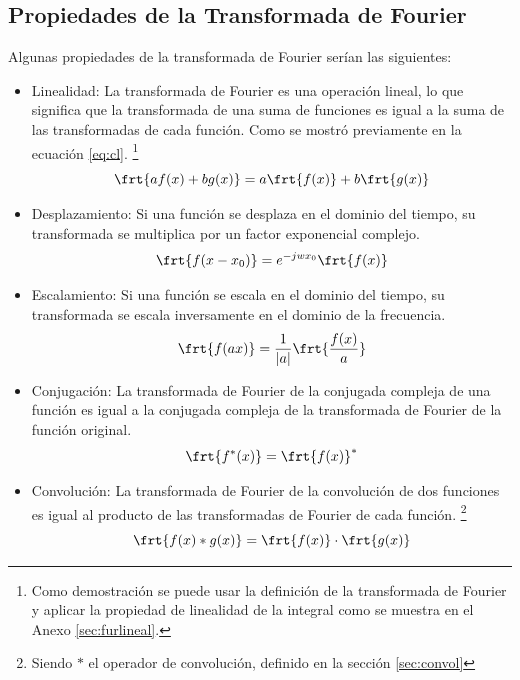 \documentclass[12pt]{article}
\begin{document}
\subsection{Propiedades de la Transformada de Fourier}
Algunas propiedades de la transformada de Fourier serían las siguientes:
\begin{itemize}
    \item Linealidad: La transformada de Fourier es una operación lineal, lo que significa que la transformada de una suma de funciones es igual a la suma de las transformadas de cada función. Como se mostró previamente en la ecuación \ref{eq:cl}. \footnote{Como demostración se puede usar la definición de la transformada de Fourier y aplicar la propiedad de linealidad de la integral como se muestra en el Anexo \ref{sec:furlineal}.}
    $$
    \frt{a f(x) + b g(x)} = a \frt{f(x)} + b \frt{g(x)}
    $$
    \item Desplazamiento: Si una función se desplaza en el dominio del tiempo, su transformada se multiplica por un factor exponencial complejo.
    $$
    \frt{f(x - x_0)} = e^{-j w x_0} \frt{f(x)}
    $$
    
    \item Escalamiento: Si una función se escala en el dominio del tiempo, su transformada se escala inversamente en el dominio de la frecuencia.
    $$
    \frt{f(ax)} = \frac{1}{|a|} \frt{\frac{f(x)}{a}}
    $$
    \item Conjugación: La transformada de Fourier de la conjugada compleja de una función es igual a la conjugada compleja de la transformada de Fourier de la función original.
    $$
    \frt{f^*(x)} = \frt{f(x)}^*
    $$
    \item Convolución: La transformada de Fourier de la convolución de dos funciones es igual al producto de las transformadas de Fourier de cada función. \footnote{Siendo $*$ el operador de convolución, definido en la sección \ref{sec:convol}}
    $$
    \frt{f(x) * g(x)} = \frt{f(x)} \cdot \frt{g(x)}
    $$
\end{itemize}
\end{document}
